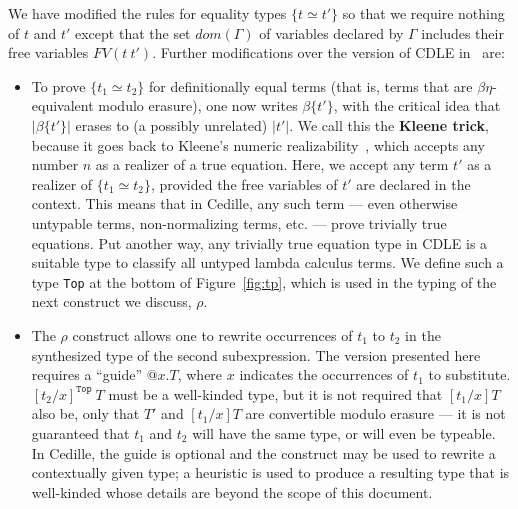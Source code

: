 \documentclass{article}
\begin{document}
We have modified the rules for equality types $\{ t \simeq t' \}$ so that we require
nothing of $t$ and $t'$ except that the set $\textit{dom}(\Gamma)$ of variables
declared by $\Gamma$ includes their free variables $\textit{FV}(t\ t')$.  Further modifications
over the version of CDLE in~\cite{stump18} are:
\begin{itemize}
\item To prove $\{ t_1 \simeq t_2\}$ for definitionally equal terms (that is,
  terms that are \(\beta\eta\)-equivalent modulo erasure), one now writes $\beta\{t'\}$,
  with the critical idea that $|\beta\{t'\}|$ erases to (a possibly unrelated) $|t'|$.
  We call this the \textbf{Kleene trick}, because it goes back to Kleene's numeric
  realizability~\cite{Kle65_Classical-Extensions-of-Intuitionistic-Mathematics},
  which accepts any number $n$ as a realizer 
  of a true equation.  Here, we accept any term $t'$ as a realizer of $\{ t_1
  \simeq t_2\}$, provided the free variables of \(t'\) are declared in the
  context.
  This means that in Cedille, any such term --- even otherwise untypable
  terms, non-normalizing terms, etc. --- prove trivially true equations.
  Put another way, any trivially true equation type in CDLE is a suitable type
  to classify all untyped lambda calculus terms.
  We define such a type \texttt{Top} at the bottom of Figure~\ref{fig:tp}, which
  is used in the typing of the next construct we discuss, \(\rho\).
\item The \(\rho\) construct allows one to rewrite occurrences of \(t_1\) to
  \(t_2\) in the synthesized type of the second subexpression.
  The version presented here requires a ``guide'' \(@x.T\), where \(x\)
  indicates the occurrences of \(t_1\) to substitute.
  \([t_2/x]^{\texttt{Top}}\ T\) must be a well-kinded type, but it is not required that
  \([t_1/x]T\) also be, only that \(T'\) and \([t_1/x]T\) are convertible modulo
  erasure --- it is not guaranteed that \(t_1\) and \(t_2\) will have the same
  type, or will even be typeable.
  In Cedille, the guide is optional and the construct may be used to rewrite a
  contextually given type; a heuristic is used to produce a resulting type that
  is well-kinded whose details are beyond the scope of this document.


\end{itemize}
\end{document}
